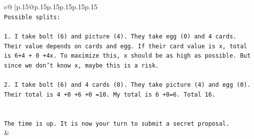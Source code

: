 \documentclass{article}
\begin{document}
{\begin{supertabular}{c@{$\;$}|p{.15\linewidth}@{}p{.15\linewidth}p{.15\linewidth}p{.15\linewidth}p{.15\linewidth}p{.15\linewidth}}
{{{\\ 
\texttt{Possible splits:} \\
\\ 
\texttt{1. I take bolt (6) and picture (4). They take egg (0) and 4 cards. Their value depends on cards and egg. If their card value is x, total is 6+4 + 0 +4x. To maximize this, x should be as high as possible. But since we don't know x, maybe this is a risk.} \\
\\ 
\texttt{2. I take bolt (6) and 4 cards (0). They take picture (4) and egg (0). Their total is 4 +0 +6 +0 =10. My total is 6 +0=6. Total 16.} \\
\\ 
\\ 
\texttt{The time is up. It is now your turn to submit a secret proposal.} \\
            }
        }
    }
    & \\ \\


\end{supertabular}}
\end{document}
